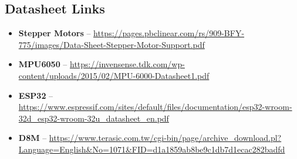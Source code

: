 \subsection{Datasheet Links}

\begin{itemize}
  \item \textbf{Stepper Motors} -- \url{https://pages.pbclinear.com/rs/909-BFY-775/images/Data-Sheet-Stepper-Motor-Support.pdf}
  \item \textbf{MPU6050} -- \url{https://invensense.tdk.com/wp-content/uploads/2015/02/MPU-6000-Datasheet1.pdf}
  \item \textbf{ESP32} -- \url{https://www.espressif.com/sites/default/files/documentation/esp32-wroom-32d_esp32-wroom-32u_datasheet_en.pdf}
  \item \textbf{D8M} --  \url{https://www.terasic.com.tw/cgi-bin/page/archive_download.pl?Language=English&No=1071&FID=d1a1859ab8be9c1db7d1ecac282badfd}
\end{itemize}